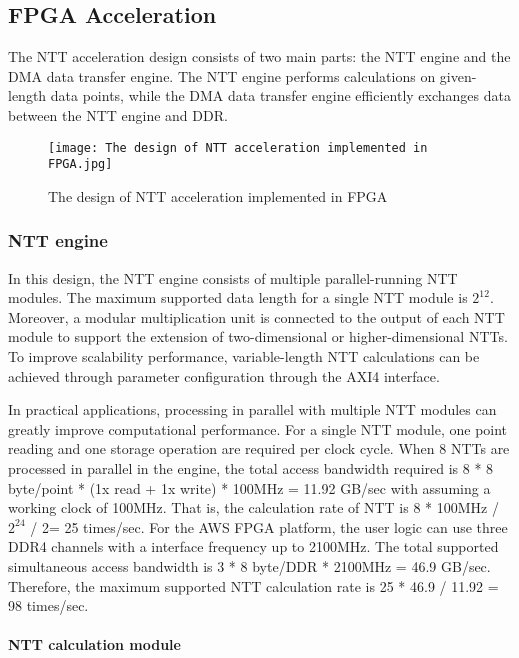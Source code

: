 \subsection{FPGA Acceleration}\label{section: fpga-acceleration}

The NTT acceleration design consists of two main parts: the NTT engine and the DMA data transfer engine. The NTT engine performs calculations on given-length data points, while the DMA data transfer engine efficiently exchanges data between the NTT engine and DDR.

\begin{figure}[ht]
  \centering
  \texttt{[image: The design of NTT acceleration implemented in FPGA.jpg]}
  \caption{The design of NTT acceleration implemented in FPGA}
  \label{fig:The design of NTT acceleration implemented in FPGA}
\end{figure}

\subsubsection{NTT engine}

In this design, the NTT engine consists of multiple parallel-running NTT modules. The maximum supported data length for a single NTT module is $2^{12}$. Moreover, a  modular multiplication unit is connected to the output of each NTT module to support the extension of two-dimensional or higher-dimensional NTTs. To improve scalability performance, variable-length NTT calculations can be achieved through parameter configuration through the AXI4 interface.

In practical applications, processing in parallel with multiple NTT modules can greatly improve computational performance. For a single NTT module, one point reading and one storage operation are required per clock cycle. When 8 NTTs are processed in parallel in the engine, the total access bandwidth required is 8 * 8 byte/point * (1x read + 1x write) * 100MHz = 11.92 GB/sec with assuming a working clock of 100MHz. That is, the calculation rate of NTT is 8 * 100MHz / $2^{24}$ / 2= 25 times/sec. For the AWS FPGA platform, the user logic can use three DDR4 channels with a interface frequency up to 2100MHz. The total supported simultaneous access bandwidth is 3 * 8 byte/DDR * 2100MHz = 46.9 GB/sec. Therefore, the maximum supported NTT calculation rate is 25 * 46.9 / 11.92 = 98 times/sec.


\paragraph*{NTT calculation module}

